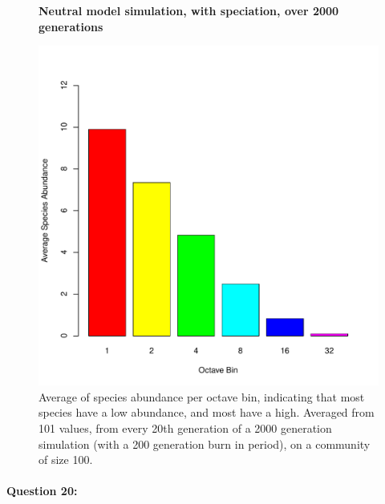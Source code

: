 \documentclass{article}
\begin{document}
	\begin{figure}[H]
	\centering
	\textbf{Neutral model simulation, with speciation, over 2000 generations}\par\medskip
	\includegraphics[width=0.8\linewidth]{../Results/octave_plot.pdf}
	\caption{Average of species abundance per octave bin, indicating that most species have a low abundance, and most have a high. Averaged from 101 values, from every 20th generation of a 2000 generation simulation (with a 200 generation burn in period), on a community of size 100.}
	\label{fig:q16}
	\end{figure}

\newpage
\paragraph{Question 20:}\
\end{document}
